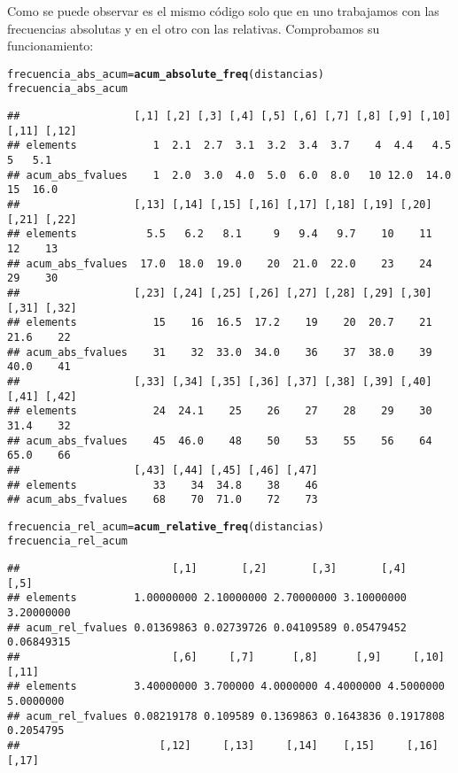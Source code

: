 \documentclass[12pt]{report}\usepackage[]{graphicx}\usepackage[dvipsnames]{xcolor}
\makeatletter
\newcommand{\hlstd}[1]{\textcolor[rgb]{0.345,0.345,0.345}{#1}}%
\newcommand{\hlkwb}[1]{\textcolor[rgb]{0.69,0.353,0.396}{#1}}%
\newcommand{\hlkwd}[1]{\textcolor[rgb]{0.737,0.353,0.396}{\textbf{#1}}}%
\newenvironment{kframe}{%
 \def\at@end@of@kframe{}%
 \ifinner\ifhmode%
  \def\at@end@of@kframe{\end{minipage}}%
  \begin{minipage}{\columnwidth}%
 \fi\fi%
 \def\FrameCommand##1{\hskip\@totalleftmargin \hskip-\fboxsep
 \colorbox{shadecolor}{##1}\hskip-\fboxsep
     \hskip-\linewidth \hskip-\@totalleftmargin \hskip\columnwidth}%
 \MakeFramed {\advance\hsize-\width
   \@totalleftmargin\z@ \linewidth\hsize
   \@setminipage}}%
 {\par\unskip\endMakeFramed%
 \at@end@of@kframe}
\newenvironment{knitrout}{}{} %
\makeatother
\begin{document}
			Como se puede observar es el mismo código solo que en uno trabajamos con las frecuencias absolutas y en el otro con las relativas. Comprobamos su funcionamiento:
			
\begin{knitrout}
\color{fgcolor}\begin{kframe}
\begin{alltt}
\hlstd{frecuencia_abs_acum} \hlkwb{=} \hlkwd{acum_absolute_freq}\hlstd{(distancias)}
\hlstd{frecuencia_abs_acum}
\end{alltt}
\begin{verbatim}
##                  [,1] [,2] [,3] [,4] [,5] [,6] [,7] [,8] [,9] [,10] [,11] [,12]
## elements            1  2.1  2.7  3.1  3.2  3.4  3.7    4  4.4   4.5     5   5.1
## acum_abs_fvalues    1  2.0  3.0  4.0  5.0  6.0  8.0   10 12.0  14.0    15  16.0
##                  [,13] [,14] [,15] [,16] [,17] [,18] [,19] [,20] [,21] [,22]
## elements           5.5   6.2   8.1     9   9.4   9.7    10    11    12    13
## acum_abs_fvalues  17.0  18.0  19.0    20  21.0  22.0    23    24    29    30
##                  [,23] [,24] [,25] [,26] [,27] [,28] [,29] [,30] [,31] [,32]
## elements            15    16  16.5  17.2    19    20  20.7    21  21.6    22
## acum_abs_fvalues    31    32  33.0  34.0    36    37  38.0    39  40.0    41
##                  [,33] [,34] [,35] [,36] [,37] [,38] [,39] [,40] [,41] [,42]
## elements            24  24.1    25    26    27    28    29    30  31.4    32
## acum_abs_fvalues    45  46.0    48    50    53    55    56    64  65.0    66
##                  [,43] [,44] [,45] [,46] [,47]
## elements            33    34  34.8    38    46
## acum_abs_fvalues    68    70  71.0    72    73
\end{verbatim}
\begin{alltt}
\hlstd{frecuencia_rel_acum} \hlkwb{=} \hlkwd{acum_relative_freq}\hlstd{(distancias)}
\hlstd{frecuencia_rel_acum}
\end{alltt}
\begin{verbatim}
##                        [,1]       [,2]       [,3]       [,4]       [,5]
## elements         1.00000000 2.10000000 2.70000000 3.10000000 3.20000000
## acum_rel_fvalues 0.01369863 0.02739726 0.04109589 0.05479452 0.06849315
##                        [,6]     [,7]      [,8]      [,9]     [,10]     [,11]
## elements         3.40000000 3.700000 4.0000000 4.4000000 4.5000000 5.0000000
## acum_rel_fvalues 0.08219178 0.109589 0.1369863 0.1643836 0.1917808 0.2054795
##                      [,12]     [,13]     [,14]    [,15]     [,16]     [,17]

\end{verbatim}
\end{kframe}
\end{knitrout}
\end{document}
